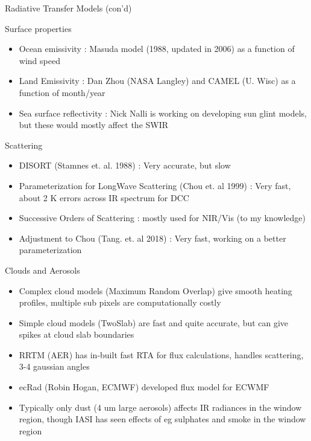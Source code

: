 \documentclass[10pt,t]{beamer}
\begin{document}
\begin{frame}[shrink=2]{Radiative Transfer Models (con'd)}
\begin{block}{Surface properties}
  \begin{itemize}
  \item Ocean emissivity : Masuda model (1988, updated in 2006) as a function of wind speed
  \item Land Emissivity : Dan Zhou (NASA Langley) and CAMEL (U. Wisc) as a function of month/year
  \item Sea surface reflectivity : Nick Nalli is working on developing sun glint models, but these would mostly affect the SWIR
  \end{itemize}
\end{block}

\begin{block}{Scattering}
  \begin{itemize}
  \item DISORT (Stamnes et. al. 1988) : Very accurate, but slow
  \item Parameterization for LongWave Scattering (Chou et. al 1999) : Very fast, about 2 K errors across IR spectrum for DCC
  \item Successive Orders of Scattering : mostly used for NIR/Vis (to my knowledge)
  \item Adjustment to Chou (Tang. et. al 2018) : Very fast, working on a better parameterization
  \end{itemize}
\end{block}

\begin{block}{Clouds and Aerosols}
  \begin{itemize}
  \item Complex cloud models (Maximum Random Overlap) give smooth heating profiles, multiple sub pixels are computationally costly
  \item Simple cloud models (TwoSlab) are fast and quite accurate, but can give spikes at cloud slab boundaries
  \item RRTM (AER) has in-built fast RTA for flux calculations, handles scattering, 3-4 gaussian angles
  \item ecRad (Robin Hogan, ECMWF) developed flux model for ECWMF
  \item Typically only dust (4 um large aerosols) affects IR radiances in the window region, though IASI has seen 
        effects of eg sulphates and smoke in the window region
  \end{itemize}
\end{block}
\end{frame}
\end{document}

